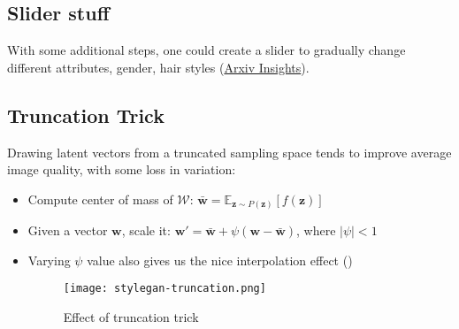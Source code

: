 \subsection{Slider stuff}
With some additional steps, one could create a slider to gradually change different attributes, \eg gender, hair styles (\href{https://youtu.be/dCKbRCUyop8}{Arxiv Insights}).

\subsection{Truncation Trick}
Drawing latent vectors from a truncated sampling space tends to improve average image quality, with some loss in variation:
\begin{itemize}
	\item Compute center of mass of $\mathcal{W}$: $\bar{\textbf{w}} = \mathbb{E}_{\textbf{z} \sim P(\textbf{z})}[f(\textbf{z})]$
	\item Given a vector $\textbf{w}$, scale it: $\textbf{w}' = \bar{\textbf{w}} + \psi(\textbf{w} - \bar{\textbf{w}})$, where $|\psi| < 1$
	\item Varying $\psi$ value also gives us the nice interpolation effect ()
	\begin{figure}[hbt!]
		\centering
		\texttt{[image: stylegan-truncation.png]}
		\caption{Effect of truncation trick}
		\label{fig:stylegan-truncation}
	\end{figure}
\end{itemize}

